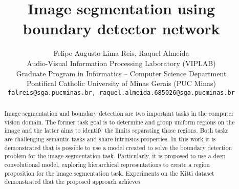 \documentclass[10pt,twocolumn,letterpaper]{article}
\begin{document}
\title{Image segmentation using boundary detector network}

\author{Felipe Augusto Lima Reis, Raquel Almeida\\
Audio-Visual Information Processing Laboratory (VIPLAB) \\
Graduate Program in Informatics -- Computer Science Department\\
Pontifical Catholic University of Minas Gerais (PUC Minas) \\ 
{\tt\small falreis@sga.pucminas.br, raquel.almeida.685026@sga.pucminas.br}
}

\maketitle


\begin{abstract}
Image segmentation and boundary detection are two important tasks in the computer vision domain. The former task goal is to determine and group uniform regions on the image and the latter aims to identify the limits  separating those regions. Both tasks are challenging semantic tasks and share intrinsics properties. In this work it is demonstrated that is possible to use a model created to solve the boundary detection problem for the image segmentation task.  Particularly, it is proposed to use a deep convolutional model, exploring hierarchical representations to create a region proposition for the image segmentation task. Experiments on the Kitti dataset demonstrated that the proposed approach achieves 
\end{abstract}
\end{document}
